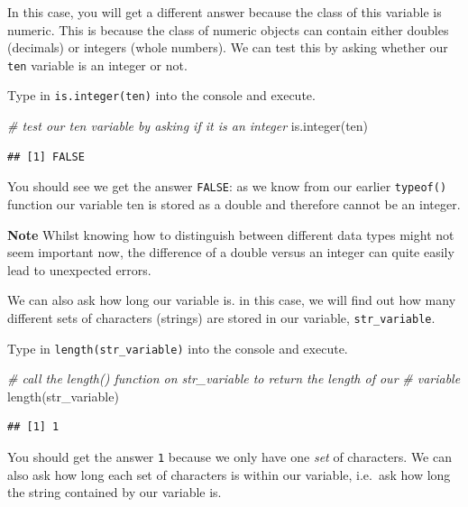\documentclass[
]{book}
\newenvironment{Shaded}{\begin{snugshade}}{\end{snugshade}}
\newcommand{\CommentTok}[1]{\textcolor[rgb]{0.56,0.35,0.01}{\textit{#1}}}
\newcommand{\FunctionTok}[1]{\textcolor[rgb]{0.00,0.00,0.00}{#1}}
\newcommand{\NormalTok}[1]{#1}
\begin{document}
In this case, you will get a different answer because the class of this variable is numeric. This is because the class of numeric objects can contain either doubles (decimals) or integers (whole numbers). We can test this by asking whether our \texttt{ten} variable is an integer or not.

Type in \texttt{is.integer(ten)} into the console and execute.

\begin{Shaded}
\begin{Highlighting}[]
\CommentTok{\# test our ten variable by asking if it is an integer}
\FunctionTok{is.integer}\NormalTok{(ten)}
\end{Highlighting}
\end{Shaded}

\begin{verbatim}
## [1] FALSE
\end{verbatim}

You should see we get the answer \texttt{FALSE}: as we know from our earlier \texttt{typeof()} function our variable ten is stored as a double and therefore cannot be an integer.

\textbf{Note}
Whilst knowing how to distinguish between different data types might not seem important now, the difference of a double versus an integer can quite easily lead to unexpected errors.

We can also ask how long our variable is. in this case, we will find out how many different sets of characters (strings) are stored in our variable, \texttt{str\_variable}.

Type in \texttt{length(str\_variable)} into the console and execute.

\begin{Shaded}
\begin{Highlighting}[]
\CommentTok{\# call the length() function on str\_variable to return the length of our}
\CommentTok{\# variable}
\FunctionTok{length}\NormalTok{(str\_variable)}
\end{Highlighting}
\end{Shaded}

\begin{verbatim}
## [1] 1
\end{verbatim}

You should get the answer \texttt{1} because we only have one \emph{set} of characters. We can also ask how long each set of characters is within our variable, i.e.~ask how long the string contained by our variable is.
\end{document}
